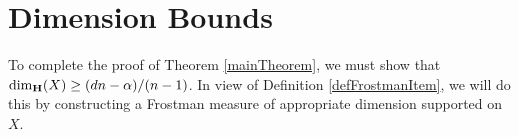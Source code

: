 \section{Dimension Bounds}\label{dimensionsection}

To complete the proof of Theorem \ref{mainTheorem}, we must show that $\operatorname{\dim_{\mathbf{H}}}(X) \geq (dn - \alpha)/(n - 1)$.  %
%
In view of Definition \ref{defFrostmanItem}, we will do this by constructing a Frostman measure of appropriate dimension supported on $X$. 
%
%

